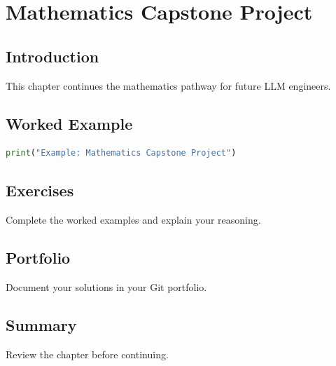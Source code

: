\chapter{Mathematics Capstone Project}
\label{chap:vol4-30}



\section{Introduction}
This chapter continues the mathematics pathway for future LLM engineers.

\section{Worked Example}
\begin{lstlisting}[language=Python]
print("Example: Mathematics Capstone Project")
\end{lstlisting}

\section{Exercises}
\begin{exercise}
Complete the worked examples and explain your reasoning.
\end{exercise}

\section{Portfolio}
Document your solutions in your Git portfolio.

\section{Summary}
Review the chapter before continuing.
